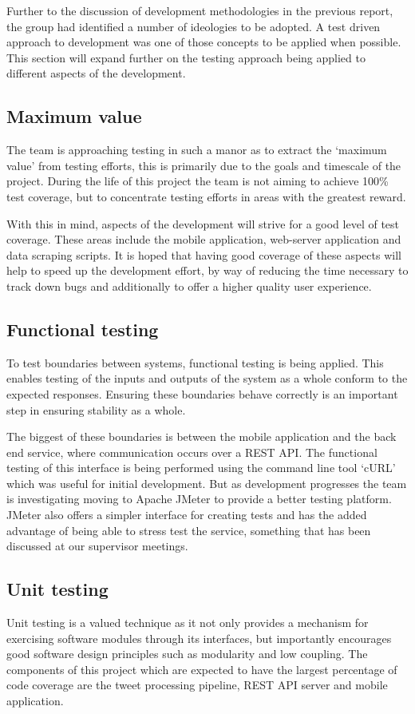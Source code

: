 Further to the discussion of development methodologies in the previous report,
the group had identified a number of ideologies to be adopted. A test driven
approach to development was one of those concepts to be applied when possible.
This section will expand further on the testing approach being applied to
different aspects of the development. 

\subsection{Maximum value}
The team is approaching testing in such a manor as to extract the `maximum
value’ from testing efforts, this is primarily due to the goals and timescale
of the project. During the life of this project the team is not aiming to
achieve 100\% test coverage, but to concentrate testing efforts in areas with
the greatest reward.

With this in mind, aspects of the development will strive for a good level of
test coverage. These areas include the mobile application, web-server
application and data scraping scripts. It is hoped that having good coverage of
these aspects will help to speed up the development effort, by way of reducing
the time necessary to track down bugs and additionally to offer a higher
quality user experience.

\subsection{Functional testing}
To test boundaries between systems, functional testing is being applied. This
enables testing of  the inputs and outputs of the system as a whole conform to
the expected responses. Ensuring these boundaries behave correctly is an
important step in ensuring stability as a whole.

The biggest of these boundaries is between the mobile application and the back
end service, where communication occurs over a REST API. The functional testing
of this interface is being performed using the command line tool ‘cURL’ which
was useful for initial development. But as development progresses the team is
investigating moving to Apache JMeter to provide a better testing platform.
JMeter also offers a simpler interface for creating tests and has the added
advantage of being able to stress test the service, something that has been
discussed at our supervisor meetings.

\subsection{Unit testing}
Unit testing is a valued technique as it not only provides a mechanism for
exercising software modules through its interfaces, but importantly encourages
good software design principles such as modularity and low coupling. The
components of this project which are expected to have the largest percentage of
code coverage are the tweet processing pipeline, REST API server and mobile
application.

